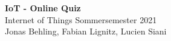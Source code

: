 \documentclass[paper=a0,pagesize,parskip=half-,fontsize=24.88pt, landscape]{scrartcl}
\begin{document}
\begin{minipage}[b]{0.74\linewidth}
  \huge\textbf{IoT - Online Quiz}\\[1cm]
  \LARGE{Internet of Things Sommersemester 2021}\\[1cm] 
  \Large{Jonas Behling, Fabian Lignitz, Lucien Siani}\\[0.4cm]
\end{minipage}
\end{document}
